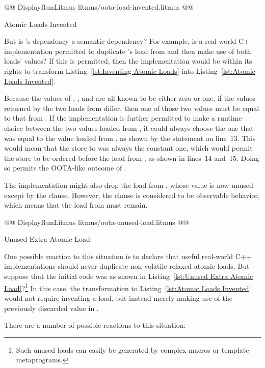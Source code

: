 \documentclass[10]{article}
\begin{document}
\begin{listing}[tbp]
@@ DisplayRunLitmus litmus/oota-load-invented.litmus @@
\caption{Atomic Loads Invented}
\label{lst:Atomic Loads Invented}
\end{listing}

But is 's dependency a semantic dependency?
For example, is a real-world C++ implementation permitted to
duplicate 's load from  and then make use of both loads'
values?
If this is permitted, then the implementation would be within its rights
to transform
Listing~\ref{lst:Inventing Atomic Loads}
into
Listing~\ref{lst:Atomic Loads Invented}.

Because the values of , , and  are all known to be
either zero or one, if the values returned by the two loads from 
differ, then one of those two values must be equal to that from .
If the implementation is further permitted to make a runtime choice
between the two values loaded from , it could always choose the
one that was equal to the value loaded from , as shown by the
 statement on line~13.
This would mean that the store to  was always the constant one,
which would permit the store to be ordered before the load from ,
as shown in lines~14 and~15.
Doing so permits the OOTA-like outcome of .

The implementation might also drop the load from , whose value
is now unused except by the  clause.
However, the  clause is considered to be observable behavior,
which means that the load from  must remain.

\begin{listing}[tbp]
@@ DisplayRunLitmus litmus/oota-unused-load.litmus @@
\caption{Unused Extra Atomic Load}
\label{lst:Unused Extra Atomic Load}
\end{listing}

One possible reaction to this situation is to declare that useful
real-world C++ implementations should never duplicate non-volatile
relaxed atomic loads.
But suppose that the initial code was as shown in
Listing~\ref{lst:Unused Extra Atomic Load}?\footnote{
	Such unused loads can easily be generated by complex macros or
	template metaprograms.}
In this case, the transformation to
Listing~\ref{lst:Atomic Loads Invented}
would not require inventing a load, but instead merely making use of
the previously discarded value in .

There are a number of possible reactions to this situation:
\end{document}
